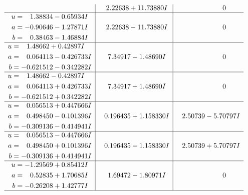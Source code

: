 \documentclass[1p]{elsarticle_modified}
\theoremstyle{definition}
\begin{document}
$$\begin{array}{c|c|c}
 & \phantom{-}2.22638 + 11.73880 I & \phantom{-0.000000 } 0 \\ \hline\begin{aligned}
u &= \phantom{-}1.38834 - 0.65934 I \\
a &= -0.90646 - 1.27871 I \\
b &= \phantom{-}0.38463 - 1.46884 I\end{aligned}
 & \phantom{-}2.22638 - 11.73880 I & \phantom{-0.000000 } 0 \\ \hline\begin{aligned}
u &= \phantom{-}1.48662 + 0.42897 I \\
a &= \phantom{-}0.064113 - 0.426733 I \\
b &= -0.621512 - 0.342282 I\end{aligned}
 & \phantom{-}7.34917 - 1.48690 I & \phantom{-0.000000 } 0 \\ \hline\begin{aligned}
u &= \phantom{-}1.48662 - 0.42897 I \\
a &= \phantom{-}0.064113 + 0.426733 I \\
b &= -0.621512 + 0.342282 I\end{aligned}
 & \phantom{-}7.34917 + 1.48690 I & \phantom{-0.000000 } 0 \\ \hline\begin{aligned}
u &= \phantom{-}0.056513 + 0.447666 I \\
a &= \phantom{-}0.498450 - 0.101396 I \\
b &= -0.309136 - 0.414941 I\end{aligned}
 & \phantom{-}0.196435 + 1.158330 I & \phantom{-}2.50739 - 5.70797 I \\ \hline\begin{aligned}
u &= \phantom{-}0.056513 - 0.447666 I \\
a &= \phantom{-}0.498450 + 0.101396 I \\
b &= -0.309136 + 0.414941 I\end{aligned}
 & \phantom{-}0.196435 - 1.158330 I & \phantom{-}2.50739 + 5.70797 I \\ \hline\begin{aligned}
u &= -1.29569 + 0.85412 I \\
a &= \phantom{-}0.52835 + 1.70685 I \\
b &= -0.26208 + 1.42777 I\end{aligned}
 & \phantom{-}1.69472 - 1.80971 I & \phantom{-0.000000 } 0\\
 \hline 
 \end{array}$$\newpage$$\begin{array}{c|c|c}  

\end{array}$$
\end{document}
